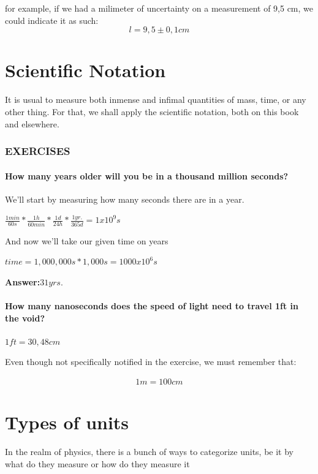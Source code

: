 \documentclass[11pt,fleqn]{book} %
\begin{document}
for example, if we had a milimeter of uncertainty on a measurement of 9,5 cm,
we could indicate it as such:
\begin{equation}
    l = 9,5 \pm 0,1 cm
\end{equation}

\section{Scientific Notation}

It is usual to measure both inmense and infimal quantities of mass, time, or any other thing.
For that, we shall apply the scientific notation, both on this book and elsewhere. 

\subsubsection{EXERCISES}

\paragraph*{How many years older will you be in a thousand million seconds?}

We'll start by measuring how many seconds there are in a year.

$ \frac{1 min}{60 s} * \frac{1 h}{60min} * \frac{1 d}{24 h} * \frac{1 yr.}{365 d} = 1x10^9 s $

And now we'll take our given time on years

$ time = 1,000,000s * 1,000s = 1000x10^6 s $

\textbf{Answer:}$ 31 yrs. $


\paragraph*{How many nanoseconds does the speed of light need to travel 1ft in the void?}

$ 1 ft = 30,48 cm $

Even though not specifically notified in the exercise, we must remember that:

\begin{gather}
    1m = 100cm    
\end{gather}

\section{Types of units}
In the realm of physics, there is a bunch of ways to categorize units, be it by what do they 
measure or how do they measure it
\end{document}
